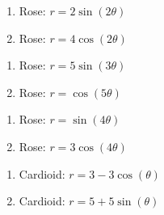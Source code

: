 \begin{multicols}{2} 

\begin{enumerate}

\setcounter{enumi}{\value{HW}}

\item Rose: $r = 2\sin(2\theta)$ 
\item Rose: $r = 4\cos(2\theta)$ 

\setcounter{HW}{\value{enumi}}

\end{enumerate}

\end{multicols}

\begin{multicols}{2} 

\begin{enumerate}

\setcounter{enumi}{\value{HW}}

\item Rose: $r = 5\sin(3\theta)$ 
\item Rose: $r = \cos(5\theta)$ 

\setcounter{HW}{\value{enumi}}

\end{enumerate}

\end{multicols}

\begin{multicols}{2} 

\begin{enumerate}

\setcounter{enumi}{\value{HW}}

\item Rose: $r = \sin(4\theta)$ 
\item Rose: $r = 3\cos(4\theta)$ \label{roseexercise8petal}

\setcounter{HW}{\value{enumi}}

\end{enumerate}

\end{multicols}

\begin{multicols}{2} 

\begin{enumerate}

\setcounter{enumi}{\value{HW}}

\item Cardioid: $r = 3 - 3\cos(\theta)$ 
\item Cardioid: $r = 5 + 5\sin(\theta)$ 

\setcounter{HW}{\value{enumi}}

\end{enumerate}

\end{multicols}

